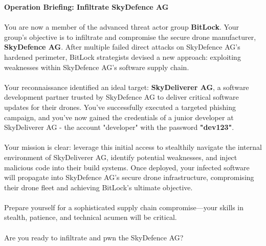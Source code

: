 \documentclass[12pt]{scrartcl}
\newenvironment{storybox}{%
    \def\FrameCommand{\fboxsep=\FrameSep\colorbox{gray!10}}%
    \MakeFramed {\advance\hsize-\width \FrameRestore}}%
    {\endMakeFramed}
\begin{document}
    \begin{storybox}
    \noindent
    \textbf{Operation Briefing: Infiltrate SkyDefence AG} \\
    \\
    \noindent
    You are now a member of the advanced threat actor group \textbf{BitLock}. Your group's objective is to infiltrate and compromise the secure drone manufacturer, \textbf{SkyDefence AG}. After multiple failed direct attacks on SkyDefence AG's hardened perimeter, BitLock strategists devised a new approach: exploiting weaknesses within SkyDefence AG's software supply chain.\\
    \\
    \noindent
    Your reconnaissance identified an ideal target: \textbf{SkyDeliverer AG}, a software development partner trusted by SkyDefence AG to deliver critical software updates for their drones. You've successfully executed a targeted phishing campaign, and you've now gained the credentials of a junior developer at SkyDeliverer AG - the account "developer" with the password \textbf{"dev123"}.\\
    \\
    \noindent
    Your mission is clear: leverage this initial access to stealthily navigate the internal environment of SkyDeliverer AG, identify potential weaknesses, and inject malicious code into their build systems. Once deployed, your infected software will propagate into SkyDefence AG's secure drone infrastructure, compromising their drone fleet and achieving BitLock's ultimate objective. \\
    \\
    \noindent
    Prepare yourself for a sophisticated supply chain compromise—your skills in stealth, patience, and technical acumen will be critical. \\
    \\
    \noindent
    Are you ready to infiltrate and pwn the SkyDefence AG?
    \end{storybox}

    \vspace{2em}
\end{document}
